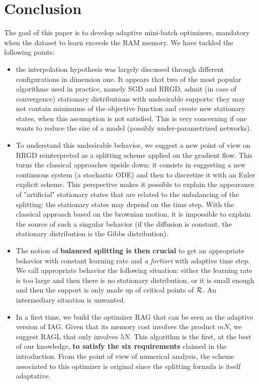 \section{Conclusion}
\label{section_conclusion}

The goal of this paper is to develop adaptive mini-batch optimizers, mandatory when the dataset to learn exceeds the RAM memory. We have tackled the following points:
\begin{itemize}
	\item the interpolation hypothesis was largely discussed through different configurations in dimension one. It appears that two of the most popular algorithms used in practice, namely SGD and RRGD, admit (in case of convergence) stationary distributions with undesirable supports: they may not contain minimums of the objective function and create new stationary states, when this assumption is not satisfied. This is very concerning if one wants to reduce the size of a model (possibly under-parametrized networks).
	\item To understand this undesirable behavior, we suggest a new point of view on RRGD reinterpreted as a splitting scheme applied on the gradient flow. This turns the
          classical approaches upside down: it consists in suggesting a new continuous system (a stochastic ODE) and then to discretize it with an Euler explicit scheme. This perspective makes it possible to explain the appearance of "artificial" stationary states that are related to the unbalancing of the splitting: the stationary states may depend on the time step. With the classical approach based on the brownian motion, it is impossible to explain the source of such a singular behavior (if the diffusion is constant, the stationary distribution is the Gibbs distribution).
        \item The notion of \textbf{balanced splitting is then crucial} to get an appropriate behavior with constant learning rate and {\em a fortiori} with adaptive time step. We call appropriate behavior the following situation: either the learning rate is too large and then there is no stationary distribution, or it is small enough and then the support is only made up of critical points of $\mathcal{R}$. An intermediary situation is unwanted.
	\item In a first time, we build the optimizer RAG that can be seen as the adaptive version of IAG. Given that its memory cost involves the product $mN$, we suggest RAGL that only involves $5N$. This algorithm is the first, at the best of our knowledge, \textbf{to satisfy the six requirements} claimed in the introduction. From the point of view of numerical analysis, the scheme associated to this optimizer is original since the splitting formula is itself adaptative.

\end{itemize}
